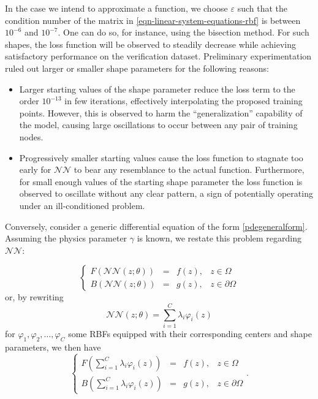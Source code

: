 \documentclass[12pt]{report} %
\begin{document}
In the case we intend to approximate a function, we choose $\varepsilon$ such that the condition number of the matrix in \eqref{eqn-linear-system-equations-rbf} is between $10^{-6}$ and $10^{-7}$. One can do so, for instance, using the bisection method. For such shapes, the loss function will be observed to steadily decrease while achieving satisfactory performance on the verification dataset. Preliminary experimentation ruled out larger or smaller shape parameters for the following reasons:
\begin{itemize}
  \item Larger starting values of the shape parameter reduce the loss term to the order $10^{-13}$ in few iterations, effectively interpolating the proposed training points. However, this is observed to harm the ``generalization'' capability of the model, causing large oscillations to occur between any pair of training nodes.
  \item Progressively smaller starting values cause the loss function to stagnate too early for $\mathcal{NN}$ to bear any resemblance to the actual function. Furthermore, for small enough values of the starting shape parameter the loss function is observed to oscillate without any clear pattern, a sign of potentially operating under an ill-conditioned problem. 
\end{itemize}

Conversely, consider a generic differential equation of the form \eqref{pdegeneralform}. Assuming the physics parameter $\gamma$ is known, we restate this problem regarding $\mathcal{NN}$:

\[ \left\{\begin{array}{rlll}
     F (\mathcal{N}\mathcal{N} (z ; \theta)) & = & f (z), & z \in \Omega\\
     B (\mathcal{N}\mathcal{N} (z ; \theta)) & = & g (z), & z \in \partial
     \Omega
   \end{array}\right. \]
or, by rewriting
\[ \mathcal{N}\mathcal{N} (z ; \theta) = \sum_{i = 1}^C \lambda_i \varphi_i
   (z) \]
for $\varphi_1, \varphi_2, \ldots, \varphi_C$ some RBFs equipped with their
corresponding centers and shape parameters, we then have
\[ \left\{\begin{array}{llll}
     F \left( \sum_{i = 1}^C \lambda_i \varphi_i (z) \right) & = & f (z), & z
     \in \Omega\\
     B \left( \sum_{i = 1}^C \lambda_i \varphi_i (z) \right) & = & g (z), & z
     \in \partial \Omega
   \end{array}\right. . \]
\end{document}
